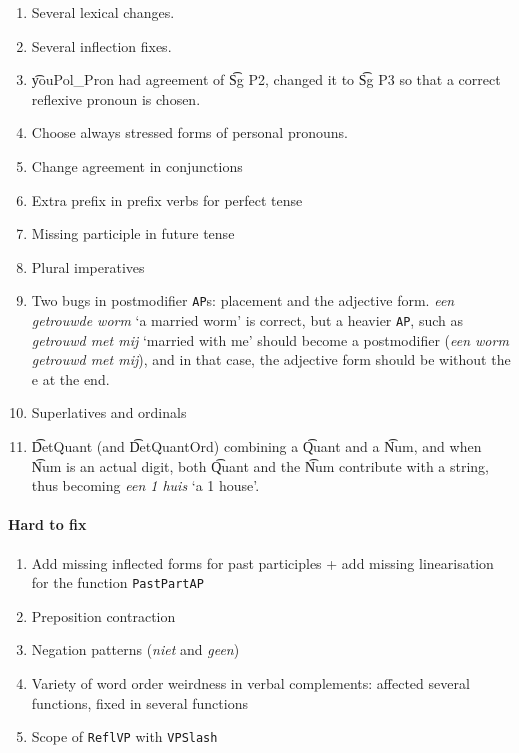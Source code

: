 \begin{enumerate}
\def\labelenumi{\arabic{enumi}.}
\itemsep1pt\parskip0pt
\item
  Several lexical changes.
\item
  Several inflection fixes.
\item
  \t{youPol\_Pron} had agreement of \t{Sg P2}, changed it to \t{Sg P3} so that a
  correct reflexive pronoun is chosen.
\item
  Choose always stressed forms of personal pronouns.
\item
  Change agreement in conjunctions
\item
  Extra prefix in prefix verbs for perfect tense
\item
  Missing participle in future tense
\item
  Plural imperatives
\item Two bugs in postmodifier \texttt{AP}s: placement and the
  adjective form. \emph{een getrouwde worm} `a married worm' is
  correct, but a heavier \texttt{AP}, such as \emph{getrouwd met mij}
  `married with me' should become a postmodifier (\emph{een worm
    getrouwd met mij}), and in that case, the adjective form should be
  without the e at the end.
\item
  Superlatives and ordinals
\item \t{DetQuant} (and \t{DetQuantOrd}) combining a \t{Quant} and a
  \t{Num}, and when \t{Num} is an actual digit, both \t{Quant} and the \t{Num}
  contribute with a string, thus becoming \emph{een 1 huis} `a 1
  house'.
\end{enumerate}

\paragraph{Hard to fix}

\begin{enumerate}
\def\labelenumi{\arabic{enumi}.}
\itemsep1pt\parskip0pt
\item
  Add missing inflected forms for past participles + add missing
  linearisation for the function \texttt{PastPartAP}
\item
  Preposition contraction
\item
  Negation patterns (\emph{niet} and \emph{geen})
\item
  Variety of word order weirdness in verbal complements: affected
  several functions, fixed in several functions
\item
  Scope of \texttt{ReflVP} with \texttt{VPSlash}
\end{enumerate}

